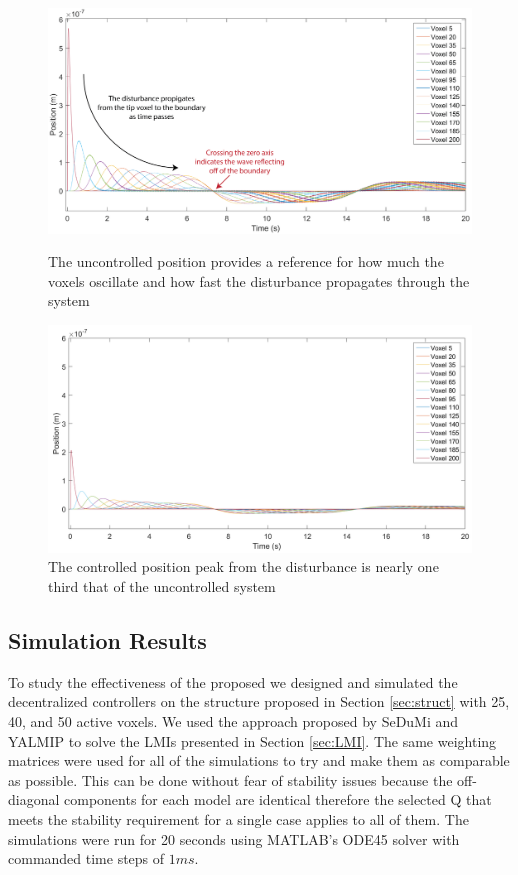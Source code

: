 \documentclass[11pt]{ucthesis}
\begin{document}
\begin{figure}[thpb]
\centering
\includegraphics[width=0.75\linewidth]{Figures/UnControlledPosition-01.png}
\caption{The uncontrolled position provides a reference for how much the voxels oscillate and how fast the disturbance propagates through the system}
\label{fig:UCPos}
\vspace*{\floatsep}
\includegraphics[width=0.75\linewidth]{Figures/Position40Controlled12_10_2016.png}
\caption{The controlled position peak from the disturbance is nearly one third that of the uncontrolled system}
\label{fig:CPos}
\end{figure}

\subsection{Simulation Results}
\label{sec:results}
To study the effectiveness of the proposed we designed and simulated the decentralized controllers on the structure proposed in Section \ref{sec:struct} with 25, 40, and 50 active voxels. We used the approach proposed by SeDuMi and YALMIP \cite{lofberg2004yalmip} to solve the LMIs presented in Section \ref{sec:LMI}. The same weighting matrices were used for all of the simulations to try and make them as comparable as possible. This can be done without fear of stability issues because the off-diagonal components for each model are identical therefore the selected Q that meets the stability requirement for a single case applies to all of them. The simulations were run for 20 seconds using MATLAB's ODE45 solver with commanded time steps of $1ms$.
\end{document}

